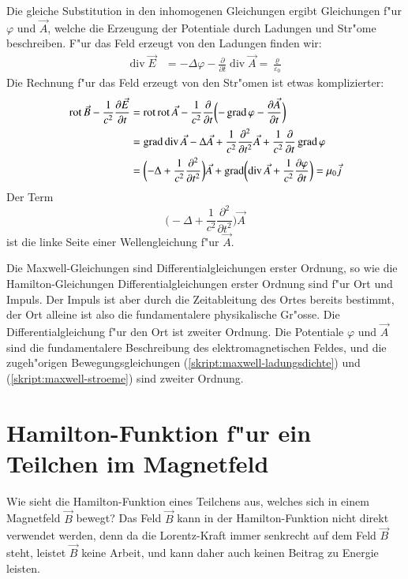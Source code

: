 Die gleiche Substitution in den inhomogenen Gleichungen ergibt Gleichungen
f"ur $\varphi$ und $\vec A$, welche die Erzeugung der Potentiale durch
Ladungen und Str"ome beschreiben.
F"ur das Feld erzeugt von den Ladungen finden wir:
\begin{align}
\operatorname{div}\vec E
&=
-\Delta\varphi -\frac{\partial}{\partial t}\operatorname{div}\vec A
=\frac{\varrho}{\varepsilon_0}
\label{skript:maxwell-ladungsdichte}
\end{align}
Die Rechnung f"ur das Feld erzeugt von den Str"omen ist etwas komplizierter:
\begin{align}
\operatorname{rot}\vec B-\frac1{c^2}\frac{\partial \vec E}{\partial t}
&=
\operatorname{rot}\operatorname{rot}\vec A
-\frac1{c^2}\frac{\partial}{\partial t}\biggl(
-\operatorname{grad}\varphi-\frac{\partial\vec A}{\partial t}
\biggr)
\notag
\\
&=
\operatorname{grad}\operatorname{div}\vec A
-\Delta \vec A+\frac{1}{c^2}\frac{\partial^2}{\partial t^2}\vec A
+\frac1{c^2}\frac{\partial}{\partial t}\operatorname{grad}\varphi
\notag
\\
&=
\biggl(-\Delta + \frac1{c^2}\frac{\partial^2}{\partial t^2}\biggr)\vec A
+\operatorname{grad}\biggl(\operatorname{div}\vec A +\frac1{c^2}\frac{\partial\varphi}{\partial t}\biggr)
=\mu_0\vec j
\label{skript:maxwell-stroeme}
\end{align}
Der Term
\[
\biggl(-\Delta + \frac1{c^2}\frac{\partial^2}{\partial t^2}\biggr)\vec A
\]
ist die linke Seite einer Wellengleichung f"ur $\vec A$.
%

Die Maxwell-Gleichungen sind Differentialgleichungen erster Ordnung,
so wie die Hamilton-Gleichungen Differentialgleichungen erster Ordnung
sind f"ur Ort und Impuls.
Der Impuls ist aber durch die Zeitableitung des Ortes bereits bestimmt,
der Ort alleine ist also die fundamentalere physikalische Gr"osse.
Die Differentialgleichung f"ur den Ort ist zweiter Ordnung.
Die Potentiale $\varphi$ und $\vec A$ sind die fundamentalere
Beschreibung des elektromagnetischen Feldes, und die zugeh"origen
Bewegungsgleichungen 
(\ref{skript:maxwell-ladungsdichte})
und
(\ref{skript:maxwell-stroeme})
sind zweiter Ordnung.

\section{Hamilton-Funktion f"ur ein Teilchen im Magnetfeld\label{section:hamilton-funktion-im-magnetfeld}}
Wie sieht die Hamilton-Funktion eines Teilchens aus, welches  sich in
einem Magnetfeld $\vec B$ bewegt?
Das Feld $\vec B$ kann in der Hamilton-Funktion nicht direkt
verwendet werden, denn da die Lorentz-Kraft immer senkrecht
auf dem Feld $\vec B$ steht, leistet $\vec B$ keine Arbeit, und kann
daher auch keinen Beitrag zu Energie leisten.

